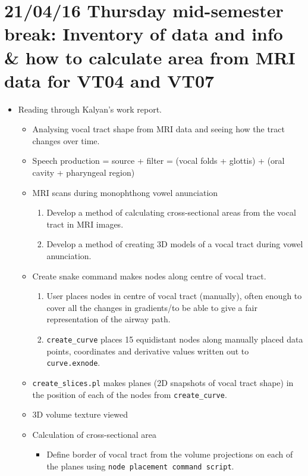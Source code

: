 \documentclass{article}
\begin{document}
\section*{21/04/16 Thursday mid-semester break: Inventory of data and info \& how to calculate area from MRI data for VT04 and VT07}
\begin{itemize}

    \item Reading through Kalyan's work report.
    \begin{itemize}
        \item Analysing vocal tract shape from MRI data and seeing how the tract changes over time.
        \item Speech production = source + filter = (vocal folds + glottis) + (oral cavity + pharyngeal region)
        \item MRI scans during monophthong vowel anunciation
        \begin{enumerate}
            \item Develop a method of calculating cross-sectional areas from the vocal tract in MRI images.
            \item Develop a method of creating 3D models of a vocal tract during vowel anunciation.
        \end{enumerate}
        \item Create snake command makes nodes along centre of vocal tract.
        \begin{enumerate}
            \item User places nodes in centre of vocal tract (manually), often enough to cover all the changes in gradients/to be able to give a fair representation of the airway path.
            \item \texttt{create\_curve} places 15 equidistant nodes along manually placed data points, coordinates and derivative values written out to \texttt{curve.exnode}.
        \end{enumerate}
        \item \texttt{create\_slices.pl} makes planes (2D snapshots of vocal tract shape) in the position of each of the nodes from \texttt{create\_curve}. 
        \item 3D volume texture viewed
        \item Calculation of cross-sectional area
        \begin{itemize}
            \item Define border of vocal tract from the volume projections on each of the planes using \texttt{node placement command script}.

\end{itemize}
\end{itemize}
\end{itemize}
\end{document}
